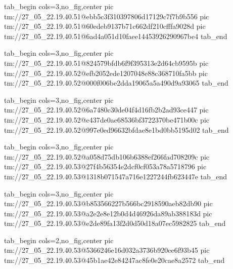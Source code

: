  
 
 
 
 

\qqSecCmtScr


\ifcmt
  tab_begin cols=3,no_fig,center
    pic tm://27_05_22.19.40.51@ebb5c3f310397806d17129c7f7b9b556
    pic tm://27_05_22.19.40.51@60edeb9137b71c662df210cfffa9028d
    pic tm://27_05_22.19.40.51@6ad4a051d10faee14453926290967be4
  tab_end
\fi


\ifcmt
  tab_begin cols=3,no_fig,center
    pic tm://27_05_22.19.40.51@824579bfdb6f9f395313e2d64cb9595b
    pic tm://27_05_22.19.40.52@efb2052ede1207048e88c368710fa5bb
    pic tm://27_05_22.19.40.52@000f006be2dda19065a5a490d9a93065
  tab_end
\fi


\ifcmt
  tab_begin cols=3,no_fig,center
    pic tm://27_05_22.19.40.52@6a7480c30de04f4d16fb2b2ad93ce447
    pic tm://27_05_22.19.40.52@e437de0ae68536bf3722370be471b00c
    pic tm://27_05_22.19.40.52@997e0ed96632bfdae8e1bd0bb5195d02
  tab_end
\fi


\ifcmt
  tab_begin cols=3,no_fig,center
    pic tm://27_05_22.19.40.52@a058d75db106b6388ef266fad708209c
    pic tm://27_05_22.19.40.53@27f4b56354e2dcf0cf053a78a5718796
    pic tm://27_05_22.19.40.53@1318b071547a716e1227244fb623447e
  tab_end
\fi


\ifcmt
  tab_begin cols=3,no_fig,center
    pic tm://27_05_22.19.40.53@b853566227b566bc2918590aeb82db90
    pic tm://27_05_22.19.40.53@a2e2e8e12b0d4d46926da89ab388183d
    pic tm://27_05_22.19.40.53@e2de89fa13f2d0d50d18a07ec5982825
  tab_end
\fi


\ifcmt
  tab_begin cols=2,no_fig,center
    pic tm://27_05_22.19.40.53@5366246e16d032a3736b920ee6f93b45
    pic tm://27_05_22.19.40.53@45b1ae42e84247ac8fe0e20cae8a2572
  tab_end
\fi

